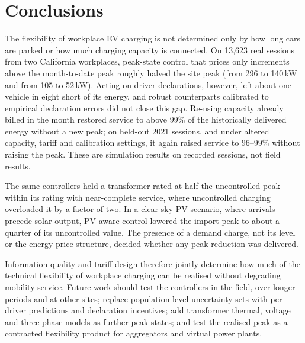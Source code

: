\section{Conclusions}\label{sec:conclusion}
The flexibility of workplace EV charging is not determined only by how long cars are parked or how much charging capacity is connected. On 13,623 real sessions from two California workplaces, peak-state control that prices only increments above the month-to-date peak roughly halved the site peak (from 296 to 140\,kW and from 105 to 52\,kW). Acting on driver declarations, however, left about one vehicle in eight short of its energy, and robust counterparts calibrated to empirical declaration errors did not close this gap. Re-using capacity already billed in the month restored service to above 99\% of the historically delivered energy without a new peak; on held-out 2021 sessions, and under altered capacity, tariff and calibration settings, it again raised service to 96--99\% without raising the peak. These are simulation results on recorded sessions, not field results.

The same controllers held a transformer rated at half the uncontrolled peak within its rating with near-complete service, where uncontrolled charging overloaded it by a factor of two. In a clear-sky PV scenario, where arrivals precede solar output, PV-aware control lowered the import peak to about a quarter of its uncontrolled value. The presence of a demand charge, not its level or the energy-price structure, decided whether any peak reduction was delivered.

Information quality and tariff design therefore jointly determine how much of the technical flexibility of workplace charging can be realised without degrading mobility service. Future work should test the controllers in the field, over longer periods and at other sites; replace population-level uncertainty sets with per-driver predictions and declaration incentives; add transformer thermal, voltage and three-phase models as further peak states; and test the realised peak as a contracted flexibility product for aggregators and virtual power plants.
